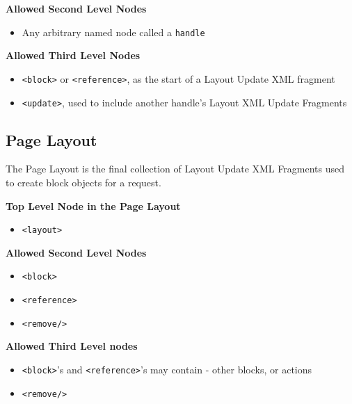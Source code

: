 \documentclass[oneside]{book}
\begin{document}
\textbf{Allowed Second Level Nodes}

\begin{itemize}
\item Any arbitrary named node called a \footnotesize\texttt{handle} \normalsize
\end{itemize}


\textbf{Allowed Third Level Nodes}

\begin{itemize}
\item \footnotesize\texttt{\textless block\textgreater } \normalsize  or \footnotesize\texttt{\textless reference\textgreater }\normalsize, as the start of a Layout Update XML fragment
\item \footnotesize\texttt{\textless update\textgreater }\normalsize, used to include another handle's Layout XML Update Fragments
\end{itemize}


\subsection{Page Layout}

The Page Layout is the final collection of Layout Update XML Fragments used to create block objects for a request.

\textbf{Top Level Node in the Page Layout}

\begin{itemize}
\item \footnotesize\texttt{\textless layout\textgreater } \normalsize
\end{itemize}


\textbf{Allowed Second Level Nodes}

\begin{itemize}
\item \footnotesize\texttt{\textless block\textgreater } \normalsize
\item \footnotesize\texttt{\textless reference\textgreater } \normalsize
\item \footnotesize\texttt{\textless remove/\textgreater } \normalsize
\end{itemize}


\textbf{Allowed Third Level nodes}

\begin{itemize}
\item \footnotesize\texttt{\textless block\textgreater }\normalsize's and \footnotesize\texttt{\textless reference\textgreater }\normalsize's may contain - other blocks, or actions
\item \footnotesize\texttt{\textless remove/\textgreater } \normalsize
\end{itemize}
\end{document}
